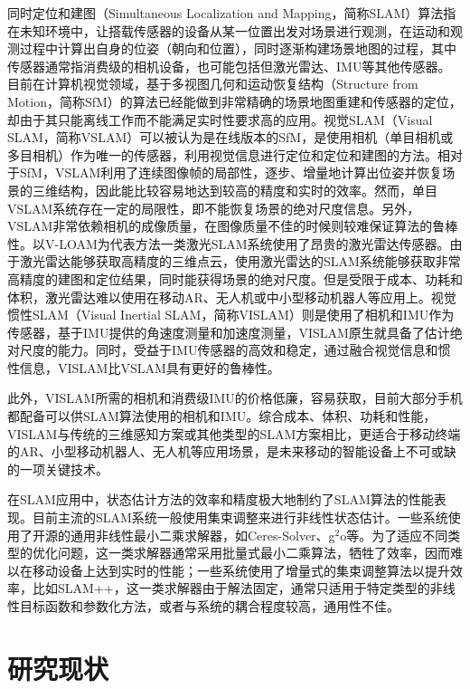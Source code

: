 \documentclass[oneside]{ZJUthesis}
\begin{document}
同时定位和建图（Simultaneous Localization and Mapping，简称SLAM）算法指在未知环境中，让搭载传感器的设备从某一位置出发对场景进行观测，在运动和观测过程中计算出自身的位姿（朝向和位置），同时逐渐构建场景地图的过程，其中传感器通常指消费级的相机设备，也可能包括但激光雷达、IMU等其他传感器。目前在计算机视觉领域，基于多视图几何和运动恢复结构（Structure from Motion，简称SfM）的算法\citep{hartley2003multiple,ma2012invitation}已经能做到非常精确的场景地图重建和传感器的定位，却由于其只能离线工作而不能满足实时性要求高的应用。视觉SLAM（Visual SLAM，简称VSLAM）可以被认为是在线版本的SfM，是使用相机（单目相机或多目相机）作为唯一的传感器，利用视觉信息进行定位和定位和建图的方法。相对于SfM，VSLAM利用了连续图像帧的局部性，逐步、增量地计算出位姿并恢复场景的三维结构，因此能比较容易地达到较高的精度和实时的效率。然而，单目VSLAM系统存在一定的局限性，即不能恢复场景的绝对尺度信息。另外，VSLAM非常依赖相机的成像质量，在图像质量不佳的时候则较难保证算法的鲁棒性。以V-LOAM\citep{zhang2015visual}为代表方法一类激光SLAM系统使用了昂贵的激光雷达传感器。由于激光雷达能够获取高精度的三维点云，使用激光雷达的SLAM系统能够获取非常高精度的建图和定位结果，同时能获得场景的绝对尺度。但是受限于成本、功耗和体积，激光雷达难以使用在移动AR、无人机或中小型移动机器人等应用上。视觉惯性SLAM（Visual Inertial SLAM，简称VISLAM）则是使用了相机和IMU作为传感器，基于IMU提供的角速度测量和加速度测量，VISLAM原生就具备了估计绝对尺度的能力。同时，受益于IMU传感器的高效和稳定，通过融合视觉信息和惯性信息，VISLAM比VSLAM具有更好的鲁棒性。

此外，VISLAM所需的相机和消费级IMU的价格低廉，容易获取，目前大部分手机都配备可以供SLAM算法使用的相机和IMU。综合成本、体积、功耗和性能，VISLAM与传统的三维感知方案或其他类型的SLAM方案相比，更适合于移动终端的AR、小型移动机器人、无人机等应用场景，是未来移动的智能设备上不可或缺的一项关键技术。

在SLAM应用中，状态估计方法的效率和精度极大地制约了SLAM算法的性能表现。目前主流的SLAM系统一般使用集束调整来进行非线性状态估计。一些系统使用了开源的通用非线性最小二乘求解器，如Ceres-Solver\citep{ceres-solver}、g$^2$o\citep{kummerle2011g}等。为了适应不同类型的优化问题，这一类求解器通常采用批量式最小二乘算法，牺牲了效率，因而难以在移动设备上达到实时的性能；一些系统使用了增量式的集束调整算法以提升效率，比如SLAM++\citep{ila2017fast}，这一类求解器由于解法固定，通常只适用于特定类型的非线性目标函数和参数化方法，或者与系统的耦合程度较高，通用性不佳。

\chapter{研究现状}
\end{document}
